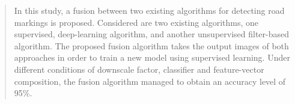 
\begin{abstract}
In this study, a fusion between two existing algorithms for detecting road markings is proposed. Considered are two existing algorithms, one supervised, deep-learning algorithm, and another unsupervised filter-based algorithm. The proposed fusion algorithm takes the output images of both approaches in order to train a new model using supervised learning. Under different conditions of downscale factor, classifier and feature-vector composition, the fusion algorithm managed to obtain an accuracy level of 95\%.
\vspace{6ex}
\end{abstract}
